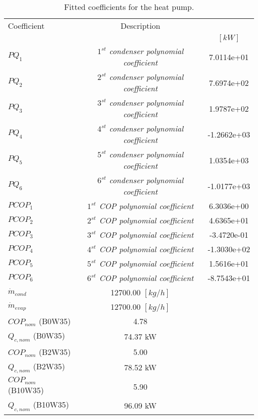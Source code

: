 \documentclass[english]{SPFShortReport}
\author{Dani Carbonell}
\begin{document}
\begin{table}[!ht]
\begin{small}
\caption{Fitted coefficients for the heat pump.}
\begin{center}
\resizebox{12cm}{!} 
{
\begin{tabular}{l | c c } 
\hline
\hline
Coefficient &Description & \\ 
 & &$[kW]$\\ 
\hline
$PQ_{1}$ & \emph{$1^{st}$ condenser polynomial coefficient}  & 7.0114e+01    \\ 
$PQ_{2}$ & \emph{$2^{st}$ condenser polynomial coefficient}  & 7.6974e+02    \\ 
$PQ_{3}$ & \emph{$3^{st}$ condenser polynomial coefficient}  & 1.9787e+02    \\ 
$PQ_{4}$ & \emph{$4^{st}$ condenser polynomial coefficient}  & -1.2662e+03    \\ 
$PQ_{5}$ & \emph{$5^{st}$ condenser polynomial coefficient}  & 1.0354e+03    \\ 
$PQ_{6}$ & \emph{$6^{st}$ condenser polynomial coefficient}  & -1.0177e+03    \\ 
\hline
$PCOP_{1}$ & \emph{$1^{st}$ COP polynomial coefficient}  & 6.3036e+00    \\ 
$PCOP_{2}$ & \emph{$2^{st}$ COP polynomial coefficient}  & 4.6365e+01    \\ 
$PCOP_{3}$ & \emph{$3^{st}$ COP polynomial coefficient}  & -3.4720e-01    \\ 
$PCOP_{4}$ & \emph{$4^{st}$ COP polynomial coefficient}  & -1.3030e+02    \\ 
$PCOP_{5}$ & \emph{$5^{st}$ COP polynomial coefficient}  & 1.5616e+01    \\ 
$PCOP_{6}$ & \emph{$6^{st}$ COP polynomial coefficient}  & -8.7543e+01    \\ 
\hline
$\dot m_{cond}$ & 12700.00 $[kg/h]$\\ 
$\dot m_{evap}$ & 12700.00 $[kg/h]$\\ 
\hline
$COP_{nom}$ (B0W35)& 4.78 \\ 
$Q_{c,nom}$ (B0W35)& 74.37 kW\\ 
$COP_{nom}$ (B2W35)& 5.00 \\ 
$Q_{c,nom}$ (B2W35)& 78.52 kW\\ 
$COP_{nom}$ (B10W35)& 5.90 \\ 
$Q_{c,nom}$ (B10W35)& 96.09 kW\\ 
\hline
\hline
\end{tabular}
}
\label{CoefTable}
\end{center}
\end{small}
\end{table}
\end{document}
